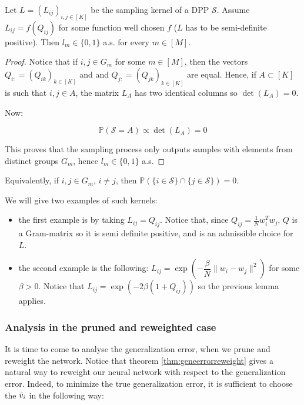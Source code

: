 \begin{lemma} \label{lem:DPPsampling}
    Let $L = (L_{ij})_{i,j \in [K]}$ be the sampling kernel of a DPP $\mathcal{S}$. Assume $L_{ij} = f(Q_{ij})$ for some function well chosen $f$ ($L$ has to be semi-definite positive). Then $l_m \in \{0,1\}$ a.s. for every $m \in [M]$. 
\end{lemma}

\begin{proof}
    Notice that if $i,j \in G_m$ for some $m \in [M]$, then the vectors $Q_{i:} = (Q_{ik})_{k \in [K]}$ and and $Q_{j:} = (Q_{jk})_{k \in [K]}$ are equal. Hence, if $A \subset [K]$ is such that $i,j \in A$, the matrix $L_A$ has two identical columns so $\det(L_A) = 0$.

    Now:

    $$ \mathbb{P}( \mathcal{S} = A)  \propto \det (L_A) = 0$$

    This proves that the sampling process only outputs samples with elements from distinct groups $G_m$, hence $l_m \in \{0,1\}$ a.s.
\end{proof}

\begin{remark}
    Equivalently, if $i,j \in G_m$, $i \neq j$, then $\mathbb{P}(\{i \in \mathcal{S} \} \cap \{j \in \mathcal{S}\}) = 0$.
\end{remark}
We will give two examples of such kernels:

\begin{itemize}
    \item the first example is by taking $L_{ij} = Q_{ij}$. Notice that, since $Q_{ij} = \frac{1}{N} w_i^Tw_j$, $Q$ is a Gram-matrix so it is semi definite positive, and is an admissible choice for $L$.
    \item the second example is the following: $L_{ij} = \exp(-\dfrac{\beta}{N} \lVert w_i -w_j \rVert^2) $ for some $\beta>0$. Notice that $L_{ij} = \exp(-2\beta (1+Q_{ij})) $ so the previous lemma applies.
\end{itemize}

\subsubsection{Analysis in the pruned and reweighted case}

It is time to come to analyse the generalization error, when we prune and reweight the network. Notice that theorem \ref{thm:geneerrorreweight} gives a natural way to reweight our neural network with respect to the generalization error. Indeed, to minimize the true generalization error, it is sufficient to choose the $\Tilde{v}_i $ in the following way:

